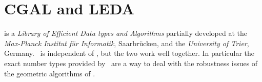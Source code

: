 \section{CGAL and LEDA}

is a {\em Library of Efficient Data types and Algorithms} partially developed 
at the {\em Max-Planck Institut f\"ur Informatik}, Saarbr\"ucken,
and the {\em University of Trier}, Germany.
\cgal\ is independent of \leda, but the two work well together.  In particular
the exact number types provided by \leda\ are a way to deal with the robustness
issues of the geometric algorithms of \cgal.
